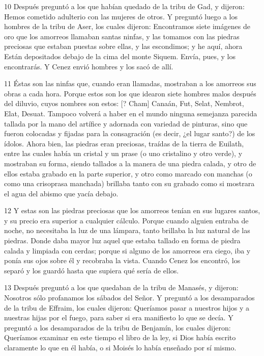 \par 10 Después preguntó a los que habían quedado de la tribu de Gad, y dijeron: Hemos cometido adulterio con las mujeres de otros. Y preguntó luego a los hombres de la tribu de Aser, los cuales dijeron: Encontramos siete imágenes de oro que los amorreos llamaban santas ninfas, y las tomamos con las piedras preciosas que estaban puestas sobre ellas, y las escondimos; y he aquí, ahora Están depositados debajo de la cima del monte Siquem. Envía, pues, y los encontrarás. Y Cenez envió hombres y los sacó de allí.

\par 11 Éstas son las ninfas que, cuando eran llamadas, mostraban a los amorreos sus obras a cada hora. Porque estos son los que idearon siete hombres malos después del diluvio, cuyos nombres son estos: [? Cham] Canaán, Fut, Selat, Nembrot, Elat, Desuat. Tampoco volverá a haber en el mundo ninguna semejanza parecida tallada por la mano del artífice y adornada con variedad de pinturas, sino que fueron colocadas y fijadas para la consagración (es decir, ¿el lugar santo?) de los ídolos. Ahora bien, las piedras eran preciosas, traídas de la tierra de Euilath, entre las cuales había un cristal y un prase (o uno cristalino y otro verde), y mostraban su forma, siendo tallados a la manera de una piedra calada, y otro de ellos estaba grabado en la parte superior, y otro como marcado con manchas (o como una crisoprasa manchada) brillaba tanto con su grabado como si mostrara el agua del abismo que yacía debajo.

\par 12 Y estas son las piedras preciosas que los amorreos tenían en sus lugares santos, y su precio era superior a cualquier cálculo. Porque cuando alguien entraba de noche, no necesitaba la luz de una lámpara, tanto brillaba la luz natural de las piedras. Donde daba mayor luz aquel que estaba tallado en forma de piedra calada y limpiada con cerdas; porque si alguno de los amorreos era ciego, iba y ponía sus ojos sobre él y recobraba la vista. Cuando Cenez los encontró, los separó y los guardó hasta que supiera qué sería de ellos.

\par 13 Después preguntó a los que quedaban de la tribu de Manasés, y dijeron: Nosotros sólo profanamos los sábados del Señor. Y preguntó a los desamparados de la tribu de Effraim, los cuales dijeron: Queríamos pasar a nuestros hijos y a nuestras hijas por el fuego, para saber si era manifiesto lo que se decía. Y preguntó a los desamparados de la tribu de Benjamín, los cuales dijeron: Queríamos examinar en este tiempo el libro de la ley, si Dios había escrito claramente lo que en él había, o si Moisés lo había enseñado por sí mismo.

